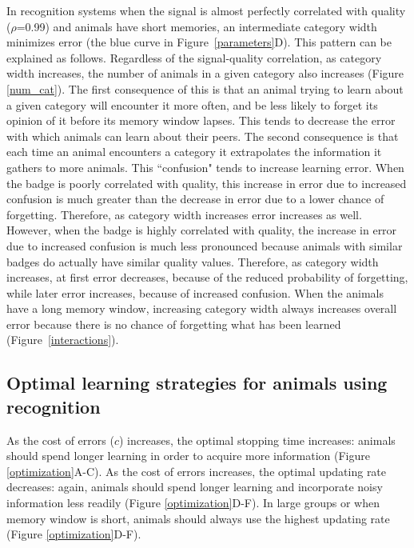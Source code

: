 In recognition systems when the signal is almost perfectly correlated with quality ($\rho$=0.99) and animals have short memories, an intermediate category width minimizes error (the blue curve in Figure~\ref{parameters}D). This pattern can be explained as follows. Regardless of the signal-quality correlation, as category width increases, the number of animals in a given category also increases (Figure \ref{num_cat}). The first consequence of this is that an animal trying to learn about a given category will encounter it more often, and be less likely to forget its opinion of it before its memory window lapses. This tends to decrease the error with which animals can learn about their peers. The second consequence is that each time an animal encounters a category it extrapolates the information it gathers to more animals. This ``confusion" tends to increase learning error. When the badge is poorly correlated with quality, this increase in error due to increased confusion is much greater than the decrease in error due to a lower chance of forgetting. Therefore, as category width increases error increases as well. However, when the badge is highly correlated with quality, the increase in error due to increased confusion is much less pronounced because animals with similar badges do actually have similar quality values. Therefore, as category width increases, at first error decreases, because of the reduced probability of forgetting, while later error increases, because of increased confusion. When the animals have a long memory window, increasing category width always increases overall error because there is no chance of forgetting what has been learned (Figure~\ref{interactions}). 

\subsection*{Optimal learning strategies for animals using recognition}
As the cost of errors ($c$) increases, the optimal stopping time increases: animals should spend longer learning in order to acquire more information (Figure \ref{optimization}A-C). As the cost of errors increases, the optimal updating rate decreases: again, animals should spend longer learning and incorporate noisy information less readily (Figure \ref{optimization}D-F). In large groups or when memory window is short, animals should always use the highest updating rate (Figure \ref{optimization}D-F). 

